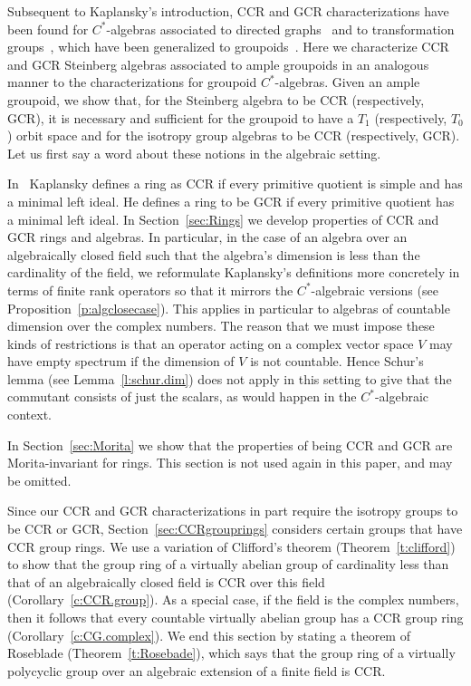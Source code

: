 \documentclass[11pt,reqno]{amsart}
\theoremstyle{plain}
\numberwithin{equation}{section}
\begin{document}
Subsequent to Kaplansky's introduction, CCR and GCR characterizations have been found for $C^*$-algebras associated to directed graphs~\cite{Eph04} and  to transformation groups~\cite{Go73,Wil81}, which have been generalized to groupoids~\cite{Cl07,vW18,vW18a}. %
Here we characterize CCR and GCR Steinberg algebras associated to ample groupoids in an analogous manner to the characterizations for groupoid $C^*$-algebras. Given an ample groupoid, we show that, for the Steinberg algebra to be CCR (respectively, GCR), it is necessary and sufficient for the groupoid to have a $T_1$ (respectively, $T_0$) orbit space and for the isotropy group algebras to be CCR (respectively, GCR).  Let us first say a word about these notions in the algebraic setting.

In~\cite{K89} Kaplansky defines a ring as CCR if every primitive quotient is simple and has a minimal left ideal. He defines a ring to be GCR if every primitive quotient has a minimal left ideal.  In Section~\ref{sec:Rings} we develop properties of CCR and GCR rings and algebras. In particular, in the case of an algebra over an algebraically closed field such that the algebra's dimension is less than the cardinality of the field, we reformulate Kaplansky's definitions more concretely in terms of finite rank operators so that it mirrors the $C^*$-algebraic versions (see Proposition~\ref{p:algclosecase}).  This applies in particular to algebras of countable dimension over the complex numbers.   The reason that we must impose these kinds of restrictions is that an operator acting on a complex vector space $V$ may have empty spectrum if the dimension of $V$ is not countable. Hence Schur's lemma (see Lemma~\ref{l:schur.dim}) does not apply in this setting to give that the commutant consists of  just the scalars, as would happen in the $C^*$-algebraic context.

In Section~\ref{sec:Morita} we show that the properties of being CCR and GCR are Morita-invariant for rings. This section is not used again in this paper, and may be omitted.

Since our CCR and GCR characterizations in part require the isotropy groups to be CCR or GCR,  Section~\ref{sec:CCRgrouprings} considers certain groups that have CCR group rings. We use a variation of Clifford's theorem (Theorem~\ref{t:clifford}) to show that the group ring of a virtually abelian group of cardinality less than that of an algebraically closed field is CCR over this field (Corollary~\ref{c:CCR.group}). As a special case, if the field is the complex numbers, then it follows that every countable virtually abelian group has a CCR group ring (Corollary~\ref{c:CG.complex}). We end this section by stating a theorem of Roseblade (Theorem~\ref{t:Rosebade}), which says that the group ring of a virtually polycyclic group over an algebraic extension of a finite field is CCR.
\end{document}
